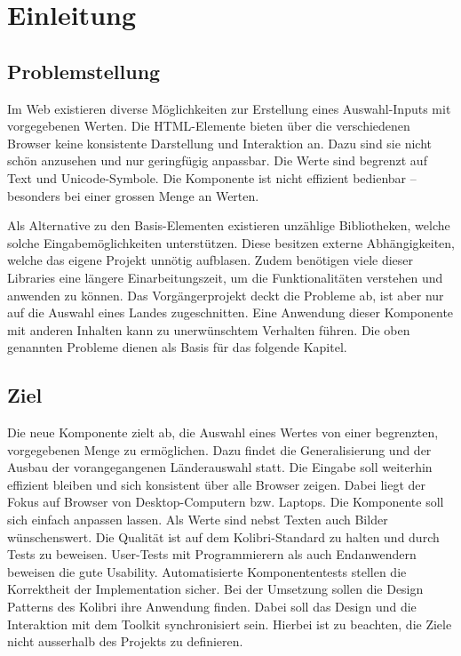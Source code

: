 \chapter{Einleitung}
\label{chap:intro}


\section{Problemstellung}
\label{sec:problem}

Im Web existieren diverse Möglichkeiten zur Erstellung eines Auswahl-Inputs mit vorgegebenen Werten. 
Die HTML-Elemente bieten über die verschiedenen Browser keine konsistente Darstellung und Interaktion an. 
Dazu sind sie nicht schön anzusehen und nur geringfügig anpassbar. 
Die Werte sind begrenzt auf Text und Unicode-Symbole. 
Die Komponente ist nicht effizient bedienbar – besonders bei einer grossen Menge an Werten. 

Als Alternative zu den Basis-Elementen existieren unzählige Bibliotheken, welche solche Eingabemöglichkeiten unterstützen. 
Diese besitzen externe Abhängigkeiten, welche das eigene Projekt unnötig aufblasen. 
Zudem benötigen viele dieser Libraries eine längere Einarbeitungszeit, um die Funktionalitäten verstehen und anwenden zu können. 
Das Vorgängerprojekt deckt die Probleme ab, ist aber nur auf die Auswahl eines Landes zugeschnitten. 
Eine Anwendung dieser Komponente mit anderen Inhalten kann zu unerwünschtem Verhalten führen. 
Die oben genannten Probleme dienen als Basis für das folgende Kapitel. 


\section{Ziel}
\label{sec:goal}

Die neue Komponente zielt ab, die Auswahl eines Wertes von einer begrenzten, vorgegebenen Menge zu ermöglichen. 
Dazu findet die Generalisierung und der Ausbau der vorangegangenen Länderauswahl statt. 
Die Eingabe soll weiterhin effizient bleiben und sich konsistent über alle Browser zeigen. 
Dabei liegt der Fokus auf Browser von Desktop-Computern bzw. Laptops. 
Die Komponente soll sich einfach anpassen lassen.
Als Werte sind nebst Texten auch Bilder wünschenswert. 
Die Qualität ist auf dem Kolibri-Standard zu halten und durch Tests zu beweisen. 
User-Tests mit Programmierern als auch Endanwendern beweisen die gute Usability.
Automatisierte Komponententests stellen die Korrektheit der Implementation sicher. 
Bei der Umsetzung sollen die Design Patterns des Kolibri ihre Anwendung finden. 
Dabei soll das Design und die Interaktion mit dem Toolkit synchronisiert sein. 
Hierbei ist zu beachten, die Ziele nicht ausserhalb des Projekts zu definieren. 


